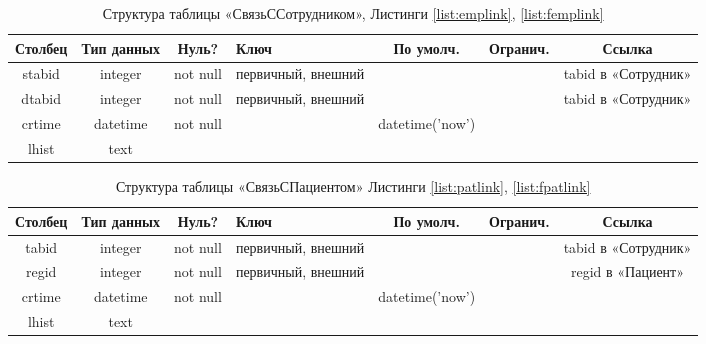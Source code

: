 \documentclass[14pt,a4paper,russian]{extreport}
\begin{document}
\begin{table}[h!]
    \centering
    \begin{tabularx}{\textwidth}{| c | c | c | X | c | X | c |}
        \hline
        \textbf{Столбец} & \textbf{Тип данных} & \textbf{Нуль?} & \textbf{Ключ} & \textbf{По
        умолч.} & \textbf{Огранич.} & \textbf{Ссылка} \\ \hline
        stabid & integer & not null & первичный, внешний & & & tabid в «Сотрудник» \\ \hline
        dtabid & integer & not null & первичный, внешний & & & tabid в «Сотрудник» \\ \hline
        crtime & datetime & not null & & datetime('now') &  & \\ \hline
        lhist & text & & & & & \\ \hline
    \end{tabularx}
    \caption{Структура таблицы «СвязьССотрудником», Листинги \ref{list:emplink}, \ref{list:femplink}}
    \label{table:emplink}
\end{table}

\begin{table}[h!]
    \centering
    \begin{tabularx}{\textwidth}{| c | c | c | X | c | X | c |}
        \hline
        \textbf{Столбец} & \textbf{Тип данных} & \textbf{Нуль?} & \textbf{Ключ} & \textbf{По
        умолч.} & \textbf{Огранич.} & \textbf{Ссылка} \\ \hline
        tabid & integer & not null & первичный, внешний & & & tabid в «Сотрудник» \\ \hline
        regid & integer & not null & первичный, внешний & & & regid в «Пациент» \\ \hline
        crtime & datetime & not null & & datetime('now') &  & \\ \hline
        lhist & text & & & & & \\ \hline
    \end{tabularx}
    \caption{Структура таблицы «СвязьСПациентом» Листинги \ref{list:patlink}, \ref{list:fpatlink}}
    \label{table:patlink}
\end{table}
\end{document}
